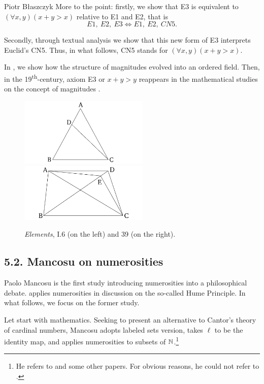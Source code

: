 \begin{artengenv}{Piotr Błaszczyk}
More to the point: firstly, we show that E3 is equivalent to  $(\forall x,y)(x+y>x)$ relative to E1 and E2, that is
\[E1,\ E2,\ E3 \Leftrightarrow E1,\ E2,\ CN5.\]

Secondly, through textual analysis we show that  this new form of E3  interprets Euclid's CN5.
Thus, in what follows, CN5 stands for $(\forall x,y)(x+y>x)$. 


In \parencite{ref_bf}, we show how the structure of magnitudes evolved into an ordered field. Then, in the 19\textsuperscript{th}-century, axiom E3 or $x+y>y$ reappears in the mathematical studies on the concept of magnitudes \parencite[\S\,6]{ref_bf}.

\begin{figure}
\centerline{\includegraphics[width=0.55\textwidth]{blaszczyk/bla-fig1a} \includegraphics[width=0.55\textwidth]{blaszczyk/bla-fig1b}}
\caption{\textit{Elements}, I.6 (on the left) and 39 (on the right).}
\label{figCN5}
\end{figure}
\subsection{5.2. Mancosu on numerosities}

Paolo Mancosu \parencite*{ref_pm09} is the first study introducing numerosities into a philosophical debate. 
\parencite{ref_pm16} applies numerosities in discussion on the so-called Hume Principle. In what follows, we focus on the former study.


Let start with mathematics. Seeking to present an alternative to Cantor's theory of cardinal numbers, Mancosu adopts labeled sets version, takes $\ell$ to be the identity map, and applies numerosities to subsets of ${\mathbb{N}}$.\footnote{He refers to \parencites{ref_BN03}{ref_BN06}{ref_BN07} and some other papers. For obvious reasons, he could not refer  to \parencite{ref_BN19}.}


\end{artengenv}
